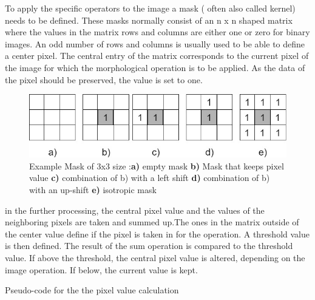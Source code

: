 To apply the specific operators to the image a mask ( often also called kernel) needs to be defined. These masks normally consist of an n x n shaped matrix where the values in the matrix rows and columns are either one or zero for binary images. An odd number of rows and columns is usually used to be able to define a center pixel. The central entry of the matrix corresponds to the current pixel of the image for which the morphological operation is to be applied. As the data of the pixel should be preserved, the value is set to one. 
\begin{figure}[H]
\includegraphics[width=\textwidth]{images/morpological_kernels.jpg}
\caption{ Example Mask of 3x3 size :\textbf{a)} empty mask \textbf{b)} Mask that keeps pixel value  \textbf{c)} combination of b) with a left shift   \textbf{d)} combination of b) with an up-shift   \textbf{e)} isotropic mask}
\label{morphological_ops} 
\end{figure}
in the further processing, the central pixel value and the values of the neighboring pixels are taken and summed up.The ones in the matrix outside of the center value define if the pixel is taken in for the operation. A threshold value is then defined. The result of the sum operation is compared to the threshold value. If above the threshold, the central pixel value is altered, depending on the image operation. If below, the current value is kept.
\begin{algorithm}
\SetAlgoLined
{}
\BlankLine
{}
\BlankLine
{}
\If{\Result $>=$ \Threshold}{\CentVal$=$ \OpVal}
\caption{Pseudo-code for the the pixel value calculation}
\label{mask_calc_pseudocode}
\end{algorithm}

